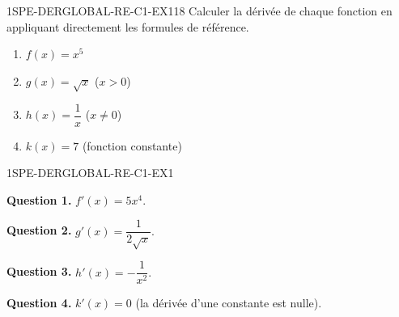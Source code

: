 

\begin{exercice}{1SPE-DERGLOBAL-RE-C1-EX1}{1}{8}
Calculer la dérivée de chaque fonction en appliquant directement les formules de référence.
\begin{enumerate}
  \item $f(x) = x^5$
  \item $g(x) = \sqrt{x}$ \quad ($x > 0$)
  \item $h(x) = \dfrac{1}{x}$ \quad ($x
\neq 0$)
  \item $k(x) = 7$ \quad (fonction constante)
\end{enumerate}
\end{exercice}



\begin{corrige}{1SPE-DERGLOBAL-RE-C1-EX1}


\textbf{Question 1.} $f'(x) = 5x^4.$

\textbf{Question 2.} $g'(x) = \dfrac{1}{2\sqrt{x}}.$

\textbf{Question 3.} $h'(x) = -\dfrac{1}{x^2}.$

\textbf{Question 4.} $k'(x) = 0$ (la dérivée d'une constante est nulle).

\end{corrige}

